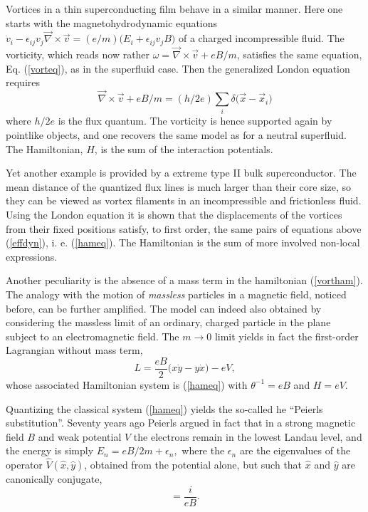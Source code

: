 \documentclass[a4paper,12pt]{article}
\newcommand{\vx}{{\vec x}}
\newcommand{\vv}{{\vec v}}
\newcommand{\vnabla}{{\vec\nabla}}
\begin{document}
Vortices in a thin superconducting film 
behave in a similar manner\cite{Fetter}.
Here one starts with the  magnetohydrodynamic equations
$
\dot{v}_{i}-\epsilon_{ij}v_{j}\vnabla\times\vv
=(e/m)\big(E_{i}+\epsilon_{ij}v_{j}B\big)
$
of  a charged incompressible fluid.
The vorticity, which reads now rather $\omega=\vnabla\times\vv+eB/m$, 
satisfies the same equation, Eq. (\ref{vorteq}), as in the superfluid 
case. Then the generalized London equation  requires
\begin{equation}
    \vnabla\times\vv+eB/m=(h/2e)\sum_{i}\delta\big(\vx-\vx_{i}\big)
    \label{London}
\end{equation}
where $h/2e$ is the flux quantum. The vorticity is hence supported
again by pointlike objects, and
one recovers the same model as for a neutral superfluid.
The Hamiltonian, $H$, is the sum of the interaction 
potentials\cite{Fetter}. 

Yet another example is provided by
a  extreme type II bulk superconductor\cite{Fetter}. 
The mean distance of the quantized flux lines
is much larger than their core size, so they can be viewed as
 vortex filaments in an incompressible and frictionless fluid.
 Using the London equation it is shown\cite{Fetter} that
 the displacements of the vortices from their
 fixed positions satisfy, to first order, 
 the same pairs of equations above (\ref{effdyn}), i. e.
(\ref{hameq}). The Hamiltonian is the sum of more involved
non-local expressions\cite{Fetter}. 
\goodbreak

 Another peculiarity is the absence of a mass term in the hamiltonian
(\ref{vortham}). 
The analogy with the motion of {\it massless} particles in a
magnetic field, noticed before\cite{HMC},
can be further amplified.
The model can indeed also obtained by considering the
massless limit of an ordinary, charged particle in the plane
subject to an electromagnetic field\cite{DJT}.
The $m\to0$ limit yields in fact the first-order Lagrangian
without mass term,
\begin{equation}
	L=\frac{eB}{2}\big(x\dot{y}-y\dot{x}\big)-eV,
\label{redlag}
\end{equation}
whose associated Hamiltonian system is (\ref{hameq}) with 
$\theta^{-1}=eB$ and $H=eV$.

Quantizing the classical system (\ref{hameq}) yields the so-called
he ``Peierls substitution''.
Seventy years ago Peierls\cite{Peierls} argued in fact that
in a strong  magnetic field $B$ and weak potential $V$
the electrons remain in the lowest Landau 
level, and the energy is simply  
$
E_{n}={eB}/{2m}+\epsilon_{n},
$
where the
$\epsilon_{n}$ are the eigenvalues of the operator 
$\hat{V}(\hat{x},\hat{y})$, obtained from the 
potential alone, but such that $\hat{x}$ and $\hat{y}$ are
canonically conjugate,
\begin{equation} 
[\hat{x},\hat{y}]=\frac{i}{eB}. 
\label{NCcoord}
\end{equation}
\end{document}
